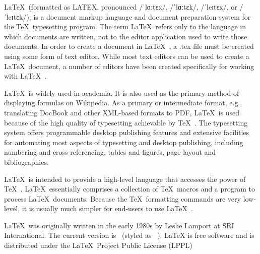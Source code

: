 
\LaTeX\ (formatted as LATEX, pronounced /ˈlɑːtɛx/, /ˈlɑːtɛk/, /ˈleɪtɛx/, or /ˈleɪtɛk/), is a document markup language and document preparation system for the \TeX\ typesetting program. The term \LaTeX\ refers only to the language in which documents are written, not to the editor application used to write those documents. In order to create a document in \LaTeX\ , a .tex file must be created using some form of text editor. While most text editors can be used to create a \LaTeX\ document, a number of editors have been created specifically for working with \LaTeX\ .

\LaTeX\ is widely used in academia. It is also used as the primary method of displaying formulas on Wikipedia. As a primary or intermediate format, e.g., translating DocBook and other XML-based formats to PDF, \LaTeX\ is used because of the high quality of typesetting achievable by \TeX\ . The typesetting system offers programmable desktop publishing features and extensive facilities for automating most aspects of typesetting and desktop publishing, including numbering and cross-referencing, tables and figures, page layout and bibliographies.

\LaTeX\ is intended to provide a high-level language that accesses the power of \TeX\ . \LaTeX\ essentially comprises a collection of \TeX\ macros and a program to process \LaTeX\ documents. Because the \TeX\ formatting commands are very low-level, it is usually much simpler for end-users to use \LaTeX\ .

\LaTeX\ was originally written in the early 1980s by Leslie Lamport at SRI International. The current version is \LaTeXe\ (styled as \LaTeXe\ ). LaTeX is free software and is distributed under the \LaTeX\ Project Public License (LPPL)

\newcommand{\keywords}{\LaTeX}
